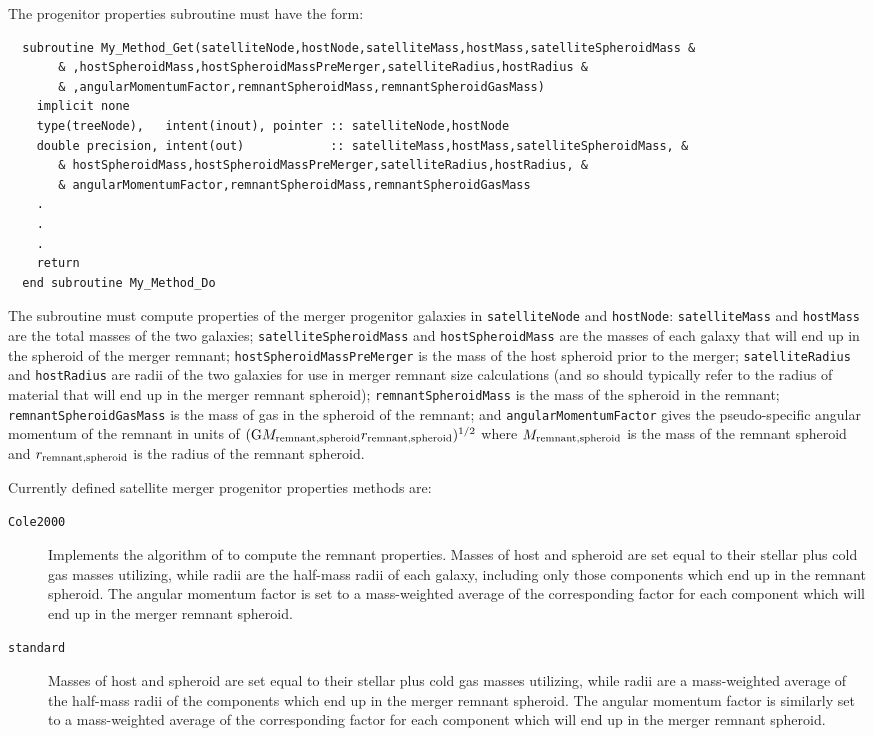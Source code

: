 The progenitor properties subroutine must have the form:
\begin{verbatim}
  subroutine My_Method_Get(satelliteNode,hostNode,satelliteMass,hostMass,satelliteSpheroidMass &
       & ,hostSpheroidMass,hostSpheroidMassPreMerger,satelliteRadius,hostRadius &
       & ,angularMomentumFactor,remnantSpheroidMass,remnantSpheroidGasMass)
    implicit none
    type(treeNode),   intent(inout), pointer :: satelliteNode,hostNode
    double precision, intent(out)            :: satelliteMass,hostMass,satelliteSpheroidMass, &
       & hostSpheroidMass,hostSpheroidMassPreMerger,satelliteRadius,hostRadius, &
       & angularMomentumFactor,remnantSpheroidMass,remnantSpheroidGasMass
    .
    .
    .
    return
  end subroutine My_Method_Do
\end{verbatim}
The subroutine must compute properties of the merger progenitor galaxies in {\tt satelliteNode} and {\tt hostNode}: {\tt satelliteMass} and {\tt hostMass} are the total masses of the two galaxies; {\tt satelliteSpheroidMass} and {\tt hostSpheroidMass} are the masses of each galaxy that will end up in the spheroid of the merger remnant; {\tt hostSpheroidMassPreMerger} is the mass of the host spheroid prior to the merger; {\tt satelliteRadius} and {\tt hostRadius} are radii of the two galaxies for use in merger remnant size calculations (and so should typically refer to the radius of material that will end up in the merger remnant spheroid); {\tt remnantSpheroidMass} is the mass of the spheroid in the remnant; {\tt remnantSpheroidGasMass} is the mass of gas in the spheroid of the remnant; and {\tt angularMomentumFactor} gives the pseudo-specific angular momentum of the remnant in units of $({\rm G} M_{\rm remnant,spheroid} r_{\rm remnant,spheroid})^{1/2}$ where $M_{\rm remnant,spheroid}$ is the mass of the 
remnant spheroid and $r_{\rm remnant,spheroid}$ is the radius of the remnant spheroid.

Currently defined satellite merger progenitor properties methods are:
\begin{description}
 \item [{\tt Cole2000}] Implements the algorithm of \cite{cole_hierarchical_2000} to compute the remnant properties. Masses of host and spheroid are set equal to their stellar plus cold gas masses utilizing, while radii are the half-mass radii of each galaxy, including only those components which end up in the remnant spheroid. The angular momentum factor is set to a mass-weighted average of the corresponding factor for each component which will end up in the merger remnant spheroid.
 \item [{\tt standard}] Masses of host and spheroid are set equal to their stellar plus cold gas masses utilizing, while radii are a mass-weighted average of the half-mass radii of the components which end up in the merger remnant spheroid. The angular momentum factor is similarly set to a mass-weighted average of the corresponding factor for each component which will end up in the merger remnant spheroid.
\end{description}

